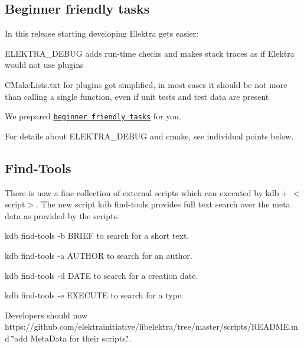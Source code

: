 \subsection*{Beginner friendly tasks}

In this release starting developing Elektra gets easier\+:


\begin{DoxyItemize}
\item {\ttfamily E\+L\+E\+K\+T\+R\+A\+\_\+\+D\+E\+B\+UG} adds run-\/time checks and makes stack traces as if Elektra would not use plugins
\item {\ttfamily C\+Make\+Lists.\+txt} for plugins got simplified, in most cases it should be not more than calling a single function, even if unit tests and test data are present
\item We prepared \href{https://github.com/ElektraInitiative/libelektra/issues?q=is%3Aissue+is%3Aopen+label%3A%22beginner+friendly%22}{\tt beginner friendly tasks} for you.
\end{DoxyItemize}

For details about {\ttfamily E\+L\+E\+K\+T\+R\+A\+\_\+\+D\+E\+B\+UG} and cmake, see individual points below.

\subsection*{Find-\/\+Tools}

There is now a fine collection of external scripts which can executed by {\ttfamily kdb + $<$script$>$}. The new script {\ttfamily kdb find-\/tools} provides full text search over the meta data as provided by the scripts.


\begin{DoxyItemize}
\item {\ttfamily kdb find-\/tools -\/b B\+R\+I\+EF} to search for a short text.
\item {\ttfamily kdb find-\/tools -\/a A\+U\+T\+H\+OR} to search for an author.
\item {\ttfamily kdb find-\/tools -\/d D\+A\+TE} to search for a creation date.
\item {\ttfamily kdb find-\/tools -\/e E\+X\+E\+C\+U\+TE} to search for a type.
\end{DoxyItemize}

Developers should now https\+://github.com/elektrainitiative/libelektra/tree/master/scripts/\+R\+E\+A\+D\+M\+E.\+md \char`\"{}add Meta\+Data for their scripts.\char`\"{}.

